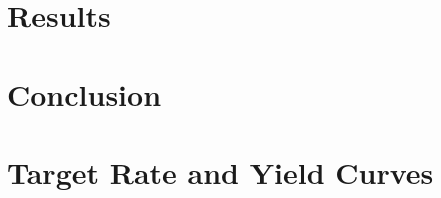 \documentclass[11pt,a4paper,english,oneside]{book}
\numberwithin{equation}{chapter}
\begin{document}
\chapter{Results}

\chapter{Conclusion}


\newpage

{} 





\newpage

\appendix
\noappendicestocpagenum
\addappheadtotoc



\renewcommand{\theequation}{A.\arabic{equation}}


\chapter{Target Rate and Yield Curves}\label{AppendixA}
\vspace{-0.5cm}
\end{document}
